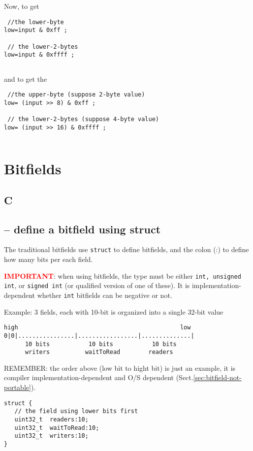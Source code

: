 Now, to get 
\begin{verbatim}
 //the lower-byte
low=input & 0xff ;

 // the lower-2-bytes
low=input & 0xffff ;
 
\end{verbatim}

and to get the 
\begin{verbatim}
 //the upper-byte (suppose 2-byte value)
low= (input >> 8) & 0xff ;

 // the lower-2-bytes (suppose 4-byte value)
low= (input >> 16) & 0xffff ;
 

\end{verbatim}

\section{Bitfields}
\label{sec:bitfields}

\subsection{C}
\label{sec:struct_bitfield}

\subsection{-- define a bitfield using struct}

The traditional bitfields use \verb!struct! to define bitfields, and the colon
(:) to define how many bits per each field. 

\textcolor{red}{\bf IMPORTANT}: when using bitfields, the type must be either
\verb!int, unsigned int!, or \verb!signed int! (or qualified version of one of
these). It is implementation-dependent whether \verb!int! bitfields can be
negative or not.

Example: 3 fields, each with 10-bit is organized into a single 32-bit value
\begin{verbatim}
high                                              low
0|0|................|.................|..............|
      10 bits           10 bits           10 bits
      writers          waitToRead        readers
\end{verbatim}
REMEMBER: the order above (low bit to hight bit) is just an example, it is
compiler implementation-dependent and O/S dependent
(Sect.\ref{sec:bitfield-not-portable}).

\begin{lstlisting}
struct {
   // the field using lower bits first
   uint32_t  readers:10;
   uint32_t  waitToRead:10;
   uint32_t  writers:10;
}
\end{lstlisting}

